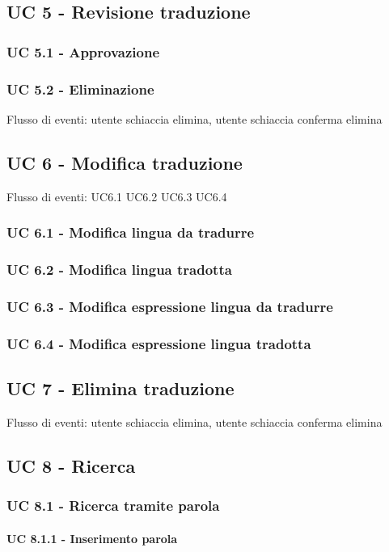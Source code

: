\subsection{UC 5 - Revisione traduzione}
    \subsubsection{UC 5.1 - Approvazione}
    \subsubsection{UC 5.2 - Eliminazione}
    Flusso di eventi: utente schiaccia elimina, utente schiaccia conferma elimina
\subsection{UC 6 - Modifica traduzione}
Flusso di eventi: UC6.1 UC6.2 UC6.3 UC6.4   %
    \subsubsection{UC 6.1 - Modifica lingua da tradurre}
    \subsubsection{UC 6.2 - Modifica lingua tradotta}
    \subsubsection{UC 6.3 - Modifica espressione lingua da tradurre}
    \subsubsection{UC 6.4 - Modifica espressione lingua tradotta}
\subsection{UC 7 - Elimina traduzione} %
Flusso di eventi: utente schiaccia elimina, utente schiaccia conferma elimina
\subsection{UC 8 - Ricerca}
    \subsubsection{UC 8.1 - Ricerca tramite parola}
        \paragraph{UC 8.1.1 - Inserimento parola}
